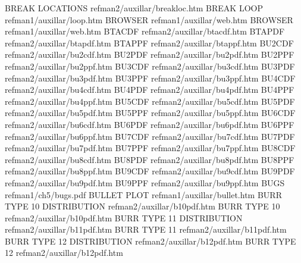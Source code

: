BREAK LOCATIONS                         refman2/auxillar/breakloc.htm
BREAK LOOP                              refman1/auxillar/loop.htm
BROWSER                                 refman1/auxillar/web.htm
BROWSER                                 refman1/auxillar/web.htm
BTACDF                                  refman2/auxillar/btacdf.htm
BTAPDF                                  refman2/auxillar/btapdf.htm
BTAPPF                                  refman2/auxillar/btappf.htm
BU2CDF                                  refman2/auxillar/bu2cdf.htm
BU2PDF                                  refman2/auxillar/bu2pdf.htm
BU2PPF                                  refman2/auxillar/bu2ppf.htm
BU3CDF                                  refman2/auxillar/bu3cdf.htm
BU3PDF                                  refman2/auxillar/bu3pdf.htm
BU3PPF                                  refman2/auxillar/bu3ppf.htm
BU4CDF                                  refman2/auxillar/bu4cdf.htm
BU4PDF                                  refman2/auxillar/bu4pdf.htm
BU4PPF                                  refman2/auxillar/bu4ppf.htm
BU5CDF                                  refman2/auxillar/bu5cdf.htm
BU5PDF                                  refman2/auxillar/bu5pdf.htm
BU5PPF                                  refman2/auxillar/bu5ppf.htm
BU6CDF                                  refman2/auxillar/bu6cdf.htm
BU6PDF                                  refman2/auxillar/bu6pdf.htm
BU6PPF                                  refman2/auxillar/bu6ppf.htm
BU7CDF                                  refman2/auxillar/bu7cdf.htm
BU7PDF                                  refman2/auxillar/bu7pdf.htm
BU7PPF                                  refman2/auxillar/bu7ppf.htm
BU8CDF                                  refman2/auxillar/bu8cdf.htm
BU8PDF                                  refman2/auxillar/bu8pdf.htm
BU8PPF                                  refman2/auxillar/bu8ppf.htm
BU9CDF                                  refman2/auxillar/bu9cdf.htm
BU9PDF                                  refman2/auxillar/bu9pdf.htm
BU9PPF                                  refman2/auxillar/bu9ppf.htm
BUGS                                    refman1/ch5/bugs.pdf
BULLET PLOT                             refman1/auxillar/bullet.htm
BURR TYPE 10 DISTRIBUTION               refman2/auxillar/b10pdf.htm
BURR TYPE 10                            refman2/auxillar/b10pdf.htm
BURR TYPE 11 DISTRIBUTION               refman2/auxillar/b11pdf.htm
BURR TYPE 11                            refman2/auxillar/b11pdf.htm
BURR TYPE 12 DISTRIBUTION               refman2/auxillar/b12pdf.htm
BURR TYPE 12                            refman2/auxillar/b12pdf.htm
